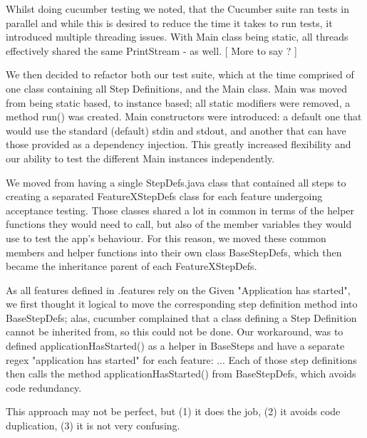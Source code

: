 \documentclass[11pt]{article}
\begin{document}
Whilst doing cucumber testing we noted, that the Cucumber suite ran tests in parallel and while this is desired to reduce the time it takes to run tests, it introduced multiple threading issues. With Main class being static, all threads effectively shared the same PrintStream  - as well. [ More to say ? ]

We then decided to refactor both our test suite, which at the time comprised of one class containing all Step Definitions, and the Main class. Main was moved from being static based, to instance based; all static modifiers were removed, a method run() was created. Main constructors were introduced: a default one that would use the standard (default) stdin and stdout, and another that can have those provided as a dependency injection. This greatly increased flexibility and our ability to test the different Main instances independently. 


We moved from having a single StepDefs.java class that contained all steps to creating a separated FeatureXStepDefs class for each feature undergoing acceptance testing. Those classes shared a lot in common in terms of the helper functions they would need to call, but also of the member variables they would use to test the app's behaviour. For this reason, we moved these common members and helper functions into their own class BaseStepDefs, which then became the inheritance parent of each FeatureXStepDefs. 

As all features defined in .features rely on the Given "Application has started", we first thought it logical to move the corresponding step definition method into BaseStepDefs; alas, cucumber complained that a class defining a Step Definition cannot be inherited from, so this could not be done. Our workaround, was to defined applicationHasStarted() as a helper in BaseSteps and have a separate regex "application has started" for each feature:
... 
Each of those step definitions then calls the method applicationHasStarted() from BaseStepDefs, which avoids code redundancy. 

This approach may not be perfect, but (1) it does the job, (2) it avoids code duplication, (3) it is not very confusing. 
\end{document}
